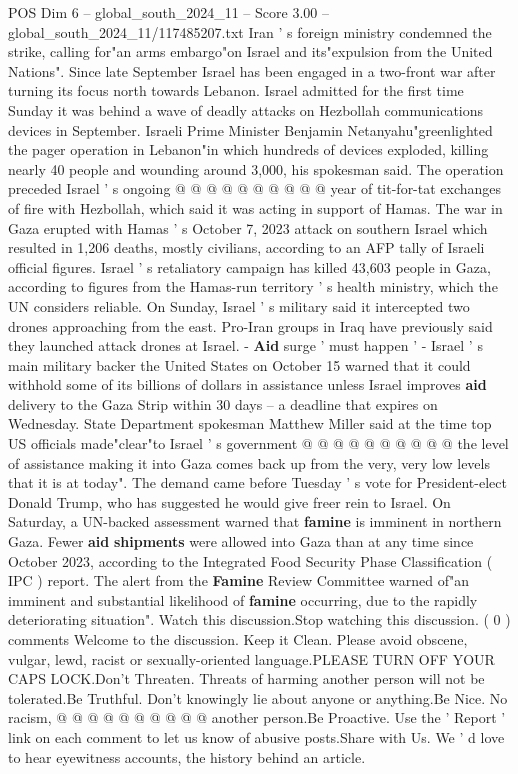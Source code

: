 \begin{textsample}{POS Dim 6 – global\_south\_2024\_11 – Score 3.00 – global\_south\_2024\_11/117485207.txt}
Iran ' s foreign ministry condemned the strike, calling for"an arms embargo"on Israel and its"expulsion from the United Nations".
Since late September Israel has been engaged in a two-front war after turning its focus north towards Lebanon.
Israel admitted for the first time Sunday it was behind a wave of deadly attacks on Hezbollah communications devices in September.
Israeli Prime Minister Benjamin Netanyahu"greenlighted the pager operation in Lebanon"in which hundreds of devices exploded, killing nearly 40 people and wounding around 3,000, his spokesman said.
The operation preceded Israel ' s ongoing @ @ @ @ @ @ @ @ @ @ year of tit-for-tat exchanges of fire with Hezbollah, which said it was acting in support of Hamas.
The war in Gaza erupted with Hamas ' s October 7, 2023 attack on southern Israel which resulted in 1,206 deaths, mostly civilians, according to an AFP tally of Israeli official figures.
Israel ' s retaliatory campaign has killed 43,603 people in Gaza, according to figures from the Hamas-run territory ' s health ministry, which the UN considers reliable.
On Sunday, Israel ' s military said it intercepted two drones approaching from the east.
Pro-Iran groups in Iraq have previously said they launched attack drones at Israel. - \textbf{Aid} surge ' must happen ' - Israel ' s main military backer the United States on October 15 warned that it could withhold some of its billions of dollars in assistance unless Israel improves \textbf{aid} delivery to the Gaza Strip within 30 days -- a deadline that expires on Wednesday.
State Department spokesman Matthew Miller said at the time top US officials made"clear"to Israel ' s government @ @ @ @ @ @ @ @ @ @ the level of assistance making it into Gaza comes back up from the very, very low levels that it is at today".
The demand came before Tuesday ' s vote for President-elect Donald Trump, who has suggested he would give freer rein to Israel.
On Saturday, a UN-backed assessment warned that \textbf{famine} is imminent in northern Gaza.
Fewer \textbf{aid} \textbf{shipments} were allowed into Gaza than at any time since October 2023, according to the Integrated Food Security Phase Classification ( IPC ) report.
The alert from the \textbf{Famine} Review Committee warned of"an imminent and substantial likelihood of \textbf{famine} occurring, due to the rapidly deteriorating situation".
Watch this discussion.Stop watching this discussion. ( 0 ) comments Welcome to the discussion.
Keep it Clean.
Please avoid obscene, vulgar, lewd, racist or sexually-oriented language.PLEASE TURN OFF YOUR CAPS LOCK.Don't Threaten.
Threats of harming another person will not be tolerated.Be Truthful.
Don't knowingly lie about anyone or anything.Be Nice.
No racism, @ @ @ @ @ @ @ @ @ @ another person.Be Proactive.
Use the ' Report ' link on each comment to let us know of abusive posts.Share with Us.
We ' d love to hear eyewitness accounts, the history behind an article.

\end{textsample}
